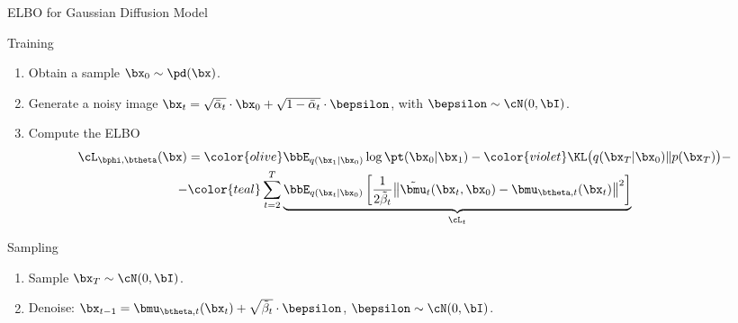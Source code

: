 \documentclass{beamer}
\begin{document}
\begin{frame}{ELBO for Gaussian Diffusion Model}
    \begin{block}{Training}
        \begin{enumerate}
            \item Obtain a sample $\bx_0 \sim \pd(\bx)$.
            \item Generate a noisy image $\bx_t = \sqrt{\bar{\alpha}_t} \cdot \bx_0 + \sqrt{1 - \bar{\alpha}_t} \cdot \bepsilon$, with $\bepsilon \sim \cN(0, \bI)$.
            \item Compute the ELBO
            \vspace{-0.3cm}
            \begin{multline*}
                \cL_{\bphi, \btheta}(\bx) =  {\color{olive}\bbE_{q(\bx_1 | \bx_0)} \log \pt(\bx_0 | \bx_1)} - {\color{violet}\KL\bigl(q(\bx_T | \bx_0) \| p(\bx_T)\bigr)} - \\
                - {\color{teal}\sum_{t=2}^T \underbrace{ \bbE_{q(\bx_t | \bx_0)} \left[\frac{1}{2\tilde{\beta}_t} \bigl\| \tilde{\bmu}_t(\bx_t, \bx_0) - \bmu_{\btheta, t}(\bx_t) \bigr\|^2  \right]}_{\cL_t}}
            \end{multline*}
            \vspace{-0.7cm}
        \end{enumerate}
    \end{block}
    \eqpause
    \begin{block}{Sampling}
        \begin{enumerate}
            \item Sample $\bx_T \sim \cN(0, \bI)$.
            \item Denoise: $\bx_{t - 1} = \bmu_{\btheta, t}(\bx_t) +  \sqrt{\tilde{\beta}_t} \cdot \bepsilon$, $\bepsilon \sim \cN(0, \bI)$.
        \end{enumerate}
    \end{block}
\end{frame}
\end{document}
